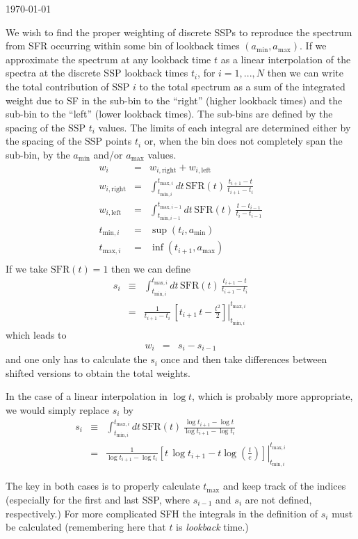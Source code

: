 \documentclass[12pt, letterpaper, preprint]{aastex}
\newcommand{\tmin}[1][]{t_{\mathrm{min} #1}}
\newcommand{\tmax}[1][]{t_{\mathrm{max} #1}}
\newcommand{\amin}{a_{\mathrm{min}}}
\newcommand{\amax} {a_{\mathrm{max}}}
\begin{document}
\author{B. Johnson}

\begin{center}
\today
\end{center}

We wish to find the proper weighting of discrete SSPs to reproduce the spectrum from SFR occurring within some bin of  lookback times $(\amin, \amax)$.
If we approximate the spectrum at any lookback time $t$ as a linear interpolation of the spectra at the discrete SSP lookback times $t_i$, for $i=1,...,N$ then we can write the total contribution of SSP $i$ to the total spectrum as a sum of the integrated weight due to SF in the sub-bin to the ``right'' (higher lookback times) and the  sub-bin to the ``left'' (lower lookback times).
The sub-bins are defined by the spacing of the SSP $t_i$ values. 
The limits of each integral are determined either by the spacing of the SSP points $t_i$ or, when the bin does not completely span the sub-bin, by the $\amin$ and/or $\amax$ values.
\begin{eqnarray}
w_i & = & w_{i, \mathrm{right}} + w_{i, \mathrm{left}} \\
w_{i, \mathrm{right}} & = & \int_{\tmin[,i]}^{\tmax[,i]} dt \, \mathrm{SFR}(t) \, \frac{t_{i+1} - t}{t_{i+1}  - t_i} \\
w_{i, \mathrm{left}} & = & \int_{\tmin[,i-1]}^{\tmax[,i-1]} dt \, \mathrm{SFR}(t) \, \frac{t - t_{i-1}}{t_{i}  - t_{i-1}} \\
\tmin[,i] & = & \sup (t_i, \amin) \\
\tmax[,i] & = & \inf (t_{i+1}, \amax) \\
\end{eqnarray}
If we take $\mathrm{SFR}(t) = 1$ then we can define
\begin{eqnarray}
s_i & \equiv & \int_{\tmin[,i]}^{\tmax[,i]} dt \, \mathrm{SFR}(t) \, \frac{t_{i+1} - t}{t_{i+1}  - t_i} \\
 & = & \left. \frac{1}{t_{i+1} - t_i} \, \left[ t_{i+1} \, t - \frac{t^2}{2} \right] \right| _{\tmin[,i]}^{\tmax[,i]}
\end{eqnarray}
which leads to
\begin{eqnarray}
w_i & = & s_{i} - s_{i-1}
\end{eqnarray}
and one only has to calculate the $s_i$ once and then take differences between shifted versions to obtain the total weights. 

In the case of a linear interpolation in $\log t$, which is probably more appropriate, we would simply replace $s_i$ by 
\begin{eqnarray}
s_i & \equiv & \int_{\tmin[,i]}^{\tmax[,i]} dt \, \mathrm{SFR}(t) \, \frac{\log t_{i+1} - \log t}{\log t_{i+1}  - \log t_i} \\
 & = & \left. \frac{1}{\log t_{i+1} - \log t_i} \left[ t \, \log t_{i+1} - t \log\left(\frac{t}{e}\right) \right] \right|_{\tmin[,i]}^{\tmax[,i]}
\end{eqnarray}

The key in both cases is to properly calculate $\tmax$ and keep track of the indices (especially for the first and last SSP, where $s_{i-1}$ and $s_i$ are not defined, respectively.)  
For more complicated SFH the integrals in the definition of $s_i$ must be calculated (remembering here that $t$ is \emph{lookback} time.)
\end{document}
